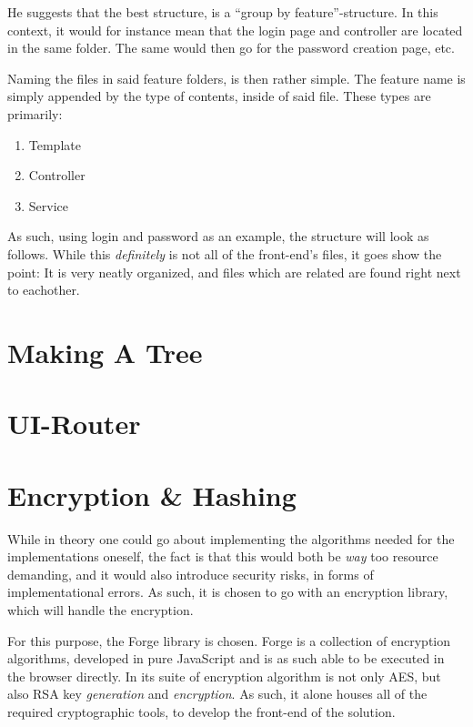 		He suggests that the best structure, is a ``group by feature''-structure. In this context, it would for instance mean that the login page and controller are located in the same folder. The same would then go for the password creation page, etc.

		Naming the files in said feature folders, is then rather simple. The feature name is simply appended by the type of contents, inside of said file. These types are primarily:
		\begin{enumerate}
			\item Template
			\item Controller
			\item Service
		\end{enumerate}
		As such, using login and password as an example, the structure will look as follows. While this \emph{definitely} is not all of the front-end's files, it goes show the point: It is very neatly organized, and files which are related are found right next to eachother.


		
	\section{Making A Tree}

	\section{UI-Router}
		\label{sec:impl:ui-router}

	\section{Encryption \& Hashing}
		While in theory one could go about implementing the algorithms needed for the implementations oneself, the fact is that this would both be \emph{way} too resource demanding, and it would also introduce security risks, in forms of implementational errors. As such, it is chosen to go with an encryption library, which will handle the encryption.

		For this purpose, the Forge library is chosen\cite{forge-encryption}. Forge is a collection of encryption algorithms, developed in pure JavaScript and is as such able to be executed in the browser directly. In its suite of encryption algorithm is not only AES, but also RSA key \emph{generation} and \emph{encryption}. As such, it alone houses all of the required cryptographic tools, to develop the front-end of the solution.

